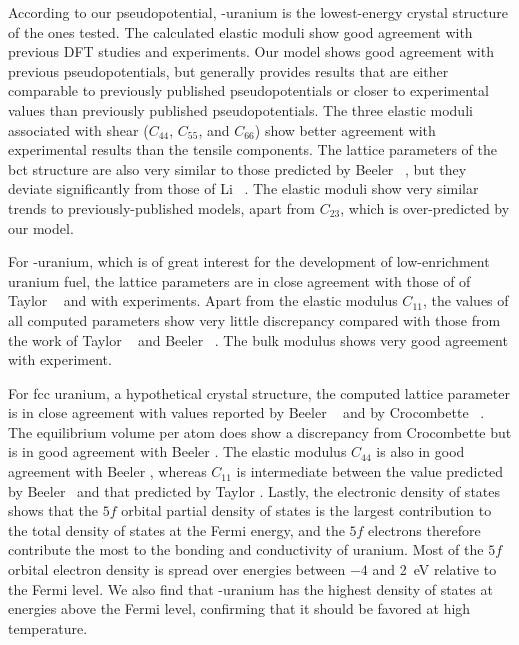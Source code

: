 According to our pseudopotential, \textalpha-uranium is the lowest-energy
crystal structure of the ones tested.
The calculated elastic moduli show good agreement with previous DFT studies
and experiments. Our model shows good agreement with previous pseudopotentials,
but generally provides results that are either comparable to previously
published pseudopotentials or closer to experimental values than previously
published pseudopotentials.
The three elastic moduli associated with shear ($C_{44}$, $C_{55}$, and
$C_{66}$) show better agreement with experimental results than the tensile
components. The lattice parameters of the bct structure are also very similar
to those predicted by Beeler \etal~\cite{beeler2013first}, but they deviate
significantly from those of Li \etal~\cite{li2012structure}.
The elastic moduli show very similar trends to previously-published models,
apart from $C_{23}$, which is over-predicted by our model.

For \textgamma-uranium, which is of great interest for the development of
low-enrichment uranium fuel, the lattice parameters are in close agreement with
those of of Taylor \etal~\cite{taylor2008evaluation} and with experiments.
Apart from the elastic modulus $C_{11}$, the values of all computed parameters
show very little discrepancy compared with those from the work of Taylor
\etal~\cite{taylor2008evaluation} and Beeler \etal~\cite{beeler2013first}.
The bulk modulus shows very good agreement with experiment.

For fcc uranium, a hypothetical crystal structure, the computed lattice
parameter is in close agreement with values reported by Beeler
\etal~\cite{beeler2013first} and by Crocombette
\etal~\cite{crocombette2001plane}. The equilibrium volume per atom does show a
discrepancy from Crocombette but is in good agreement with Beeler \etal.
The elastic modulus $C_{44}$ is also in good agreement with Beeler \etal,
whereas $C_{11}$ is intermediate between the value predicted by Beeler \etal\
and that predicted by Taylor \etal.
Lastly, the electronic density of states shows that the $5f$
orbital partial density of states is the largest contribution to the total
density of states at the Fermi energy, and the $5f$ electrons therefore
contribute the most to the bonding and conductivity of uranium. Most of the
$5f$ orbital electron density is spread over energies between $-4$ and 2~eV
relative to the Fermi level. We also find that \textgamma-uranium has the
highest density of states at energies above the Fermi level, confirming that it
should be favored at high temperature.

